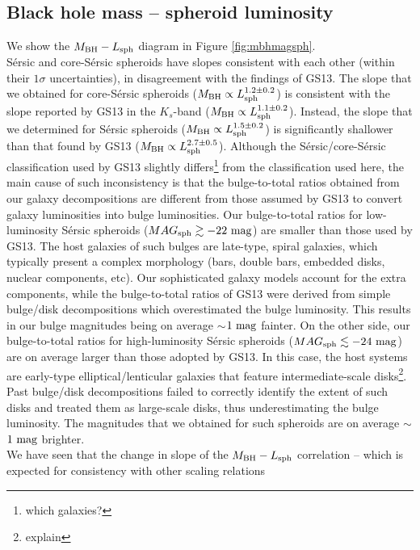 \documentclass[preprint2]{emulateapj}
\begin{document}
\subsection{Black hole mass -- spheroid luminosity}
We show the $M_{\rm BH} - L_{\rm sph}$ diagram in Figure \ref{fig:mbhmagsph}. \\
S\'ersic and core-S\'ersic spheroids have slopes consistent with each other (within their $1\sigma$ uncertainties), 
in disagreement with the findings of GS13. 
The slope that we obtained for core-S\'ersic spheroids ($M_{\rm BH} \propto L_{\rm sph}^{1.2 \pm 0.2}$) 
is consistent with the slope reported by GS13 in the $K_s$-band ($M_{\rm BH} \propto L_{\rm sph}^{1.1 \pm 0.2}$). 
Instead, the slope that we determined for S\'ersic spheroids ($M_{\rm BH} \propto L_{\rm sph}^{1.5 \pm 0.2}$) 
is significantly shallower than that found by GS13 ($M_{\rm BH} \propto L_{\rm sph}^{2.7 \pm 0.5}$). 
Although the S\'ersic/core-S\'ersic classification used by GS13 slightly differs\footnote{which galaxies?} from the classification used here, 
the main cause of such inconsistency is that the bulge-to-total ratios obtained from our galaxy decompositions 
are different from those assumed by GS13 to convert galaxy luminosities into bulge luminosities.
Our bulge-to-total ratios for low-luminosity S\'ersic spheroids ($MAG_{\rm sph} \gtrsim -22 \rm~mag$) 
are smaller than those used by GS13. 
The host galaxies of such bulges are late-type, spiral galaxies, 
which typically present a complex morphology (bars, double bars, embedded disks, nuclear components, etc).
Our sophisticated galaxy models account for the extra components, 
while the bulge-to-total ratios of GS13 were derived from simple bulge/disk decompositions 
which overestimated the bulge luminosity.
This results in our bulge magnitudes being on average $\sim$$1\rm~mag$ fainter.
On the other side, our bulge-to-total ratios for high-luminosity S\'ersic spheroids ($MAG_{\rm sph} \lesssim -24 \rm~mag$) 
are on average larger than those adopted by GS13.
In this case, the host systems are early-type elliptical/lenticular galaxies that feature intermediate-scale disks\footnote{explain}.
Past bulge/disk decompositions failed to correctly identify the extent of such disks and treated them as large-scale disks, 
thus underestimating the bulge luminosity.
The magnitudes that we obtained for such spheroids are on average $\sim$$1\rm~mag$ brighter. \\
We have seen that the change in slope of the $M_{\rm BH} - L_{\rm sph}$ correlation -- 
which is expected for consistency with other scaling relations 
\end{document}
